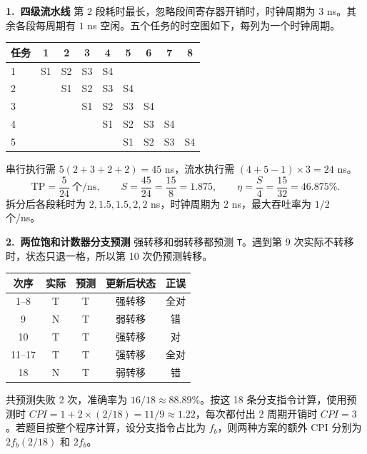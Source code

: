 \documentclass[zihao=-4,a4paper,fontset=windows]{ctexart}
\newcommand{\sect}[1]{\par\needspace{5\baselineskip}\medskip\noindent{\zihao{4}\heiti #1}\par\smallskip}
\begin{document}
\clearpage
\sect{四、综合题}
\noindent\textbf{1.\ 四级流水线}\quad
第 2 段耗时最长，忽略段间寄存器开销时，时钟周期为 $3$ ns。其余各段每周期有 $1$ ns 空闲。五个任务的时空图如下，每列为一个时钟周期。
\begin{center}
\begin{tabular}{l*{8}{c}}
\toprule
任务 & 1 & 2 & 3 & 4 & 5 & 6 & 7 & 8\\
\midrule
1 & S1 & S2 & S3 & S4 & & & &\\
2 & & S1 & S2 & S3 & S4 & & &\\
3 & & & S1 & S2 & S3 & S4 & &\\
4 & & & & S1 & S2 & S3 & S4 &\\
5 & & & & & S1 & S2 & S3 & S4\\
\bottomrule
\end{tabular}
\end{center}
串行执行需 $5(2+3+2+2)=45$ ns，流水执行需 $(4+5-1)\times3=24$ ns。
\[
\mathrm{TP}=\frac{5}{24}\ \text{个/ns},\qquad
S=\frac{45}{24}=\frac{15}{8}=1.875,\qquad
\eta=\frac{S}{4}=\frac{15}{32}=46.875\%.
\]
拆分后各段耗时为 $2,1.5,1.5,2,2$ ns，时钟周期为 $2$ ns，最大吞吐率为 $1/2$ 个/ns。

\medskip
\noindent\textbf{2.\ 两位饱和计数器分支预测}\quad
强转移和弱转移都预测 \texttt{T}。遇到第 9 次实际不转移时，状态只退一格，所以第 10 次仍预测转移。
\begin{center}
\begin{tabular}{ccccc}
\toprule
次序 & 实际 & 预测 & 更新后状态 & 正误\\
\midrule
1--8 & T & T & 强转移 & 全对\\
9 & N & T & 弱转移 & 错\\
10 & T & T & 强转移 & 对\\
11--17 & T & T & 强转移 & 全对\\
18 & N & T & 弱转移 & 错\\
\bottomrule
\end{tabular}
\end{center}
共预测失败 2 次，准确率为 $16/18\approx88.89\%$。按这 18 条分支指令计算，使用预测时 $CPI=1+2\times(2/18)=11/9\approx1.22$，每次都付出 2 周期开销时 $CPI=3$。若题目按整个程序计算，设分支指令占比为 $f_b$，则两种方案的额外 CPI 分别为 $2f_b(2/18)$ 和 $2f_b$。
\end{document}
